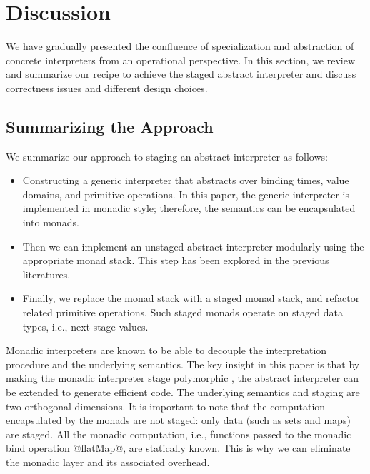 \section{Discussion} \label{discussion}

We have gradually presented the confluence of specialization and abstraction of
concrete interpreters from an operational perspective.  In this section, we
review and summarize our recipe to achieve the staged abstract interpreter and
discuss correctness issues and different design choices.

\subsection{Summarizing the Approach}

We summarize our approach to staging an abstract interpreter as follows:

\begin{itemize}
  \item Constructing a generic interpreter that abstracts over binding times,
    value domains, and primitive operations. In this paper, the generic interpreter
    is implemented in monadic style; therefore, the semantics can be encapsulated
    into monads.
  \item Then we can implement an unstaged abstract interpreter modularly using
    the appropriate monad stack. This step has been explored in the previous
    literatures.
  \item Finally, we replace the monad stack with a staged monad stack, and
    refactor related primitive operations.  Such staged monads operate on
    staged data types, i.e., next-stage values.
\end{itemize}

Monadic interpreters are known to be able to decouple the interpretation
procedure and the underlying semantics. The key insight in this paper is that
by making the monadic interpreter stage polymorphic
\cite{Ofenbeck:2017:SGP:3136040.3136060, Amin:2017:CTI:3177123.3158140}, the
abstract interpreter can be extended to generate efficient code. The
underlying semantics and staging are two orthogonal dimensions. It is important
to note that the computation encapsulated by the monads are not staged: only
data (such as sets and maps) are staged. All the monadic computation, i.e.,
functions passed to the monadic bind operation @flatMap@, are statically known.
This is why we can eliminate the monadic layer and its associated overhead.

